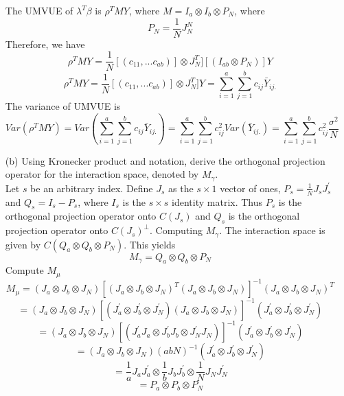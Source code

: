 \documentclass{homework}
\begin{document}
\begin{itemize}
    The UMVUE of $\lambda^T \beta$ is $\rho^T MY$, where $M= I_a \otimes I_b \otimes P_N$, where 
    \[ 
    P_N = \frac{1}{N} J_{N}^{N}
    \]    
    Therefore, we have
    \[ 
    \rho^T MY = \frac{1}{N} [(c_{11}, ... c_{ab})]\otimes J_N^T] [(I_{ab} \otimes P_N)] Y
    \]
    \[ 
    \rho^T MY = \frac{1}{N} [(c_{11}, ... c_{ab})]\otimes J_N^T] Y = \sum_{i=1}^{a} \sum_{j=1}^{b} c_{ij}\bar{Y}_{ij.}
    \]
    The variance of UMVUE is
    \[ 
    Var(\rho^T MY) = Var(\sum_{i=1}^{a} \sum_{j=1}^{b} c_{ij}\bar{Y}_{ij.}) =\sum_{i=1}^{a} \sum_{j=1}^{b} c_{ij}^2Var(\bar{Y}_{ij.}) = \sum_{i=1}^{a} \sum_{j=1}^{b} c_{ij}^2 \frac{\sigma^2}{N}
    \] 
    
    \item[(b)] Using Kronecker product and notation, derive the orthogonal projection operator for the interaction space, denoted by $M_{\gamma}$.\\
    Let $s$ be an arbitrary index. Define $J_s$ as the $s \times 1$ vector of ones, $P_s = \frac{1}{N} J_s J_s^{'}$ and $Q_s = I_s -P_s$, where $I_s$ is the $s \times s$ identity matrix. Thus $P_s$ is the orthogonal projection operator onto $C(J_s)$ and $Q_s$ is the orthogonal projection operator onto $C(J_s)^{\perp}$.   
    Computing $M_\gamma$. The interaction space is given by $C(Q_a \otimes Q_b \otimes P_N)$. This yields
    \[ 
    M_\gamma = Q_a \otimes Q_b \otimes P_N
    \]    
    Compute $M_\mu$
    \[ 
    M_\mu = (J_a \otimes J_b \otimes J_N) [(J_a \otimes J_b \otimes J_N)^{T}(J_a \otimes J_b \otimes J_N)]^{-1} (J_a \otimes J_b \otimes J_N)^{T}
    \]  
    \[ 
     = (J_a \otimes J_b \otimes J_N) [(J_a ^{'}\otimes J_b^{'} \otimes J_N^{'})(J_a \otimes J_b \otimes J_N)]^{-1} (J_a^{'} \otimes J_b^{'} \otimes J_N^{'})
    \] 
    \[ 
     = (J_a \otimes J_b \otimes J_N) [(J_a ^{'}J_a\otimes J_b^{'}J_b \otimes J_N^{'}J_N)]^{-1}(J_a^{'} \otimes J_b^{'} \otimes J_N^{'})
    \]
    \[ 
     = (J_a \otimes J_b \otimes J_N) (abN)^{-1} (J_a^{'} \otimes J_b^{'} \otimes J_N^{'})
    \]
    \[ 
     = \frac{1}{a}J_aJ_a^{'} \otimes \frac{1}{b}J_bJ_b^{'} \otimes \frac{1}{N}J_NJ_N^{'} 
    \]
    \[ 
     = P_a \otimes P_b \otimes P_N
    \]
    

\end{itemize}
\end{document}
